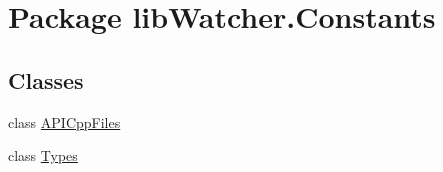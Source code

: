 \hypertarget{namespacelib_watcher_1_1_constants}{\section{Package lib\+Watcher.\+Constants}
\label{namespacelib_watcher_1_1_constants}
}
\subsection*{Classes}
\begin{DoxyCompactItemize}
\item 
class \hyperlink{classlib_watcher_1_1_constants_1_1_a_p_i_cpp_files}{A\+P\+I\+Cpp\+Files}
\item 
class \hyperlink{classlib_watcher_1_1_constants_1_1_types}{Types}
\end{DoxyCompactItemize}
